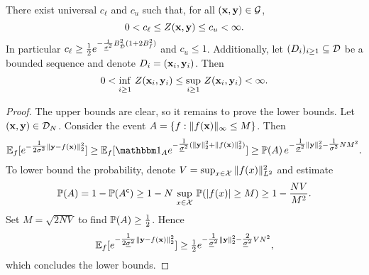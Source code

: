 \documentclass[12pt]{report}
\begin{document}
\begin{proposition} \label{prop:bounds_Z}
    There exist universal $c_\ell$ and $c_u$ such that, for all $(\vx, \vy) \in \G$,
    \begin{equation}
        0
        < c_\ell
        \le Z(\vx, \vy)
        \le c_u
        < \infty.
    \end{equation}
    In particular $c_\ell \ge \frac12 e^{-\frac{1}{\underline{\sigma}^2} B_{\tilde\D}^2 (1 + 2 B_f^2)}$ and $c_u \le 1$.
    Additionally, let $(D_i)_{i \ge 1} \sub \D$ be a bounded sequence and denote $D_i = (\vx_i, \vy_i)$.
    Then
    \begin{equation}
        0
        < \inf_{i \ge 1}\, Z(\vx_i, \vy_i)
        \le \sup_{i \ge 1}\, Z(\vx_i, \vy_i)
        < \infty.
    \end{equation}
\end{proposition}
\begin{proof}
    The upper bounds are clear, so it remains to prove the lower bounds.
    Let $(\vx, \vy) \in \D_N$.
    Consider the event $A = \set{f : \norm{f(\vx)}_\infty \le M}$.
    Then
    \begin{equation}
        \E_f[e^{-\tfrac1{2\sigma^2}\norm{\vy - f(\vx)}_2^2}]
        \ge \E_f[\ind_A e^{-\tfrac1{\underline{\sigma}^2}(\norm{\vy}_2^2 + \norm{f(\vx)}_2^2)}]
        \ge \P(A)\, e^{-\tfrac1{\underline{\sigma}^2}\norm{\vy}_2^2 - \tfrac{1}{\sigma^2} N M^2}.
    \end{equation}
    To lower bound the probability, denote $V = \sup_{x \in \X}\, \norm{f(x)}^2_{L^2}$ and estimate
    \begin{equation}
        \P(A)
        = 1 - \P(A^\c) \vphantom{\sup_{x \in \X}}
        \ge 1 - \vphantom{\frac NN} N\,\sup_{x \in \X}\, \P(\abs{f(x)} \ge M)
        \ge 1 - \frac{N V}{M^2}.
    \end{equation}
    Set $M = \sqrt{2 N V}$ to find $\P(A) \ge \tfrac12$.
    Hence
    \begin{equation}
        \E_f[e^{-\tfrac1{2\underline{\sigma}^2}\norm{\vy - f(\vx)}_2^2}]
        \ge \tfrac12 e^{-\tfrac1{\underline{\sigma}^2}\norm{\vy}_2^2 - \tfrac{2}{\underline{\sigma}^2} VN^2},
    \end{equation}
    which concludes the lower bounds.
\end{proof}
\end{document}
